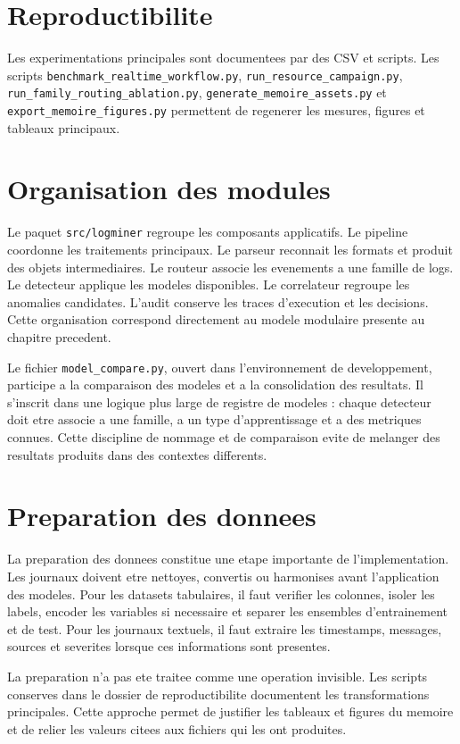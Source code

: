 \section{Reproductibilite}
Les experimentations principales sont documentees par des CSV et scripts. Les scripts \texttt{benchmark\_realtime\_workflow.py}, \texttt{run\_resource\_campaign.py}, \texttt{run\_family\_routing\_ablation.py}, \texttt{generate\_memoire\_assets.py} et \texttt{export\_memoire\_figures.py} permettent de regenerer les mesures, figures et tableaux principaux.

\section{Organisation des modules}
Le paquet \texttt{src/logminer} regroupe les composants applicatifs. Le pipeline coordonne les traitements principaux. Le parseur reconnait les formats et produit des objets intermediaires. Le routeur associe les evenements a une famille de logs. Le detecteur applique les modeles disponibles. Le correlateur regroupe les anomalies candidates. L'audit conserve les traces d'execution et les decisions. Cette organisation correspond directement au modele modulaire presente au chapitre precedent.

Le fichier \texttt{model\_compare.py}, ouvert dans l'environnement de developpement, participe a la comparaison des modeles et a la consolidation des resultats. Il s'inscrit dans une logique plus large de registre de modeles : chaque detecteur doit etre associe a une famille, a un type d'apprentissage et a des metriques connues. Cette discipline de nommage et de comparaison evite de melanger des resultats produits dans des contextes differents.

\section{Preparation des donnees}
La preparation des donnees constitue une etape importante de l'implementation. Les journaux doivent etre nettoyes, convertis ou harmonises avant l'application des modeles. Pour les datasets tabulaires, il faut verifier les colonnes, isoler les labels, encoder les variables si necessaire et separer les ensembles d'entrainement et de test. Pour les journaux textuels, il faut extraire les timestamps, messages, sources et severites lorsque ces informations sont presentes.

La preparation n'a pas ete traitee comme une operation invisible. Les scripts conserves dans le dossier de reproductibilite documentent les transformations principales. Cette approche permet de justifier les tableaux et figures du memoire et de relier les valeurs citees aux fichiers qui les ont produites.

